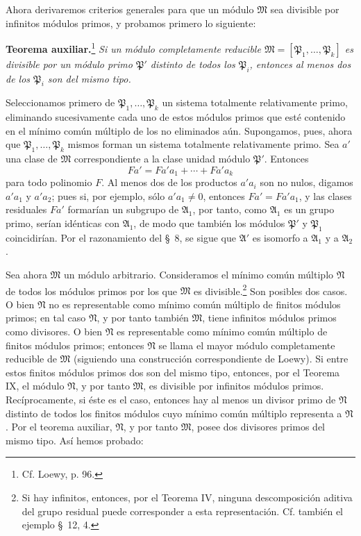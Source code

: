 \documentclass[11pt]{article}
\begin{document}
Ahora derivaremos criterios generales para que un módulo $\mathfrak M$ sea divisible por infinitos módulos primos, y probamos primero lo siguiente:

\textbf{Teorema auxiliar.}\footnote{Cf. Loewy, p. 96.} \emph{Si un módulo completamente reducible $\mathfrak M=[\mathfrak P_1,\ldots,\mathfrak P_k]$ es divisible por un módulo primo $\mathfrak P'$ distinto de todos los $\mathfrak P_i$, entonces al menos dos de los $\mathfrak P_i$ son del mismo tipo.}

Seleccionamos primero de $\mathfrak P_1,\ldots,\mathfrak P_k$ un sistema totalmente relativamente primo, eliminando sucesivamente cada uno de estos módulos primos que esté contenido en el mínimo común múltiplo de los no eliminados aún. Supongamos, pues, ahora que $\mathfrak P_1,\ldots,\mathfrak P_k$ mismos forman un sistema totalmente relativamente primo. Sea $a'$ una clase de $\mathfrak M$ correspondiente a la clase unidad módulo $\mathfrak P'$. Entonces
\[
 Fa'=Fa'a_1+
\cdots+Fa'a_k
\]
para todo polinomio $F$. Al menos dos de los productos $a'a_i$ son no nulos, digamos $a'a_1$ y $a'a_2$; pues si, por ejemplo, sólo $a'a_1\ne0$, entonces $Fa'=Fa'a_1$, y las clases residuales $Fa'$ formarían un subgrupo de $\mathfrak A_1$, por tanto, como $\mathfrak A_1$ es un grupo primo, serían idénticas con $\mathfrak A_1$, de modo que también los módulos $\mathfrak P'$ y $\mathfrak P_1$ coincidirían. Por el razonamiento del \S~8, se sigue que $\mathfrak A'$ es isomorfo a $\mathfrak A_1$ y a $\mathfrak A_2$.

Sea ahora $\mathfrak M$ un módulo arbitrario. Consideramos el mínimo común múltiplo $\mathfrak N$ de todos los módulos primos por los que $\mathfrak M$ es divisible.\footnote{Si hay infinitos, entonces, por el Teorema IV, ninguna descomposición aditiva del grupo residual puede corresponder a esta representación. Cf. también el ejemplo \S~12, 4.} Son posibles dos casos. O bien $\mathfrak N$ no es representable como mínimo común múltiplo de finitos módulos primos; en tal caso $\mathfrak N$, y por tanto también $\mathfrak M$, tiene infinitos módulos primos como divisores. O bien $\mathfrak N$ es representable como mínimo común múltiplo de finitos módulos primos; entonces $\mathfrak N$ se llama el mayor módulo completamente reducible de $\mathfrak M$ (siguiendo una construcción correspondiente de Loewy). Si entre estos finitos módulos primos dos son del mismo tipo, entonces, por el Teorema IX, el módulo $\mathfrak N$, y por tanto $\mathfrak M$, es divisible por infinitos módulos primos. Recíprocamente, si éste es el caso, entonces hay al menos un divisor primo de $\mathfrak N$ distinto de todos los finitos módulos cuyo mínimo común múltiplo representa a $\mathfrak N$. Por el teorema auxiliar, $\mathfrak N$, y por tanto $\mathfrak M$, posee dos divisores primos del mismo tipo. Así hemos probado:
\end{document}
